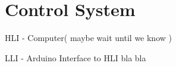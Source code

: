 \section{Control System}\label{sec:ControlComputation}

HLI - Computer( maybe wait until we know )

LLI - Arduino Interface to HLI bla bla

